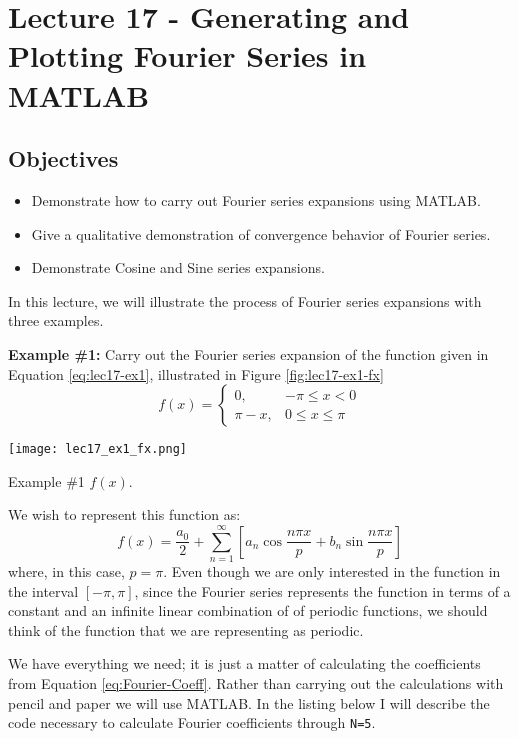 \chapter{Lecture 17 - Generating and Plotting Fourier Series in MATLAB}
\label{ch:lec17}
\section{Objectives}
\begin{itemize}
\item Demonstrate how to carry out Fourier series expansions using MATLAB.
\item Give a qualitative demonstration of convergence behavior of Fourier series.
\item Demonstrate Cosine and Sine series expansions.
\end{itemize}
In this lecture, we will illustrate the process of Fourier series expansions with three examples.

\vspace{0.5cm}

\noindent\textbf{Example \#1:}
Carry out the Fourier series expansion of the function given in Equation \ref{eq:lec17-ex1}, illustrated in Figure \ref{fig:lec17-ex1-fx}
\begin{equation}
f(x) = 
\begin{cases}
0, & -\pi \le x < 0 \\
\pi - x, & 0 \le x \le \pi
\end{cases}
\label{eq:lec17-ex1}
\end{equation}
\begin{marginfigure}
\texttt{[image: lec17\_ex1\_fx.png]}
\caption{Example \#1 $f(x)$.}
\label{fig:lec17-ex1-fx}
\end{marginfigure}
We wish to represent this function as:
\begin{equation*}
f(x) = \frac{a_0}{2} + \sum\limits_{n=1}^{\infty} \left[a_n \cos{\frac{n \pi x}{p}} + b_n \sin{\frac{n \pi x}{p}} \right]
\end{equation*}
where, in this case, $p = \pi$.  Even though we are only interested in the function in the interval $[-\pi, \pi]$, since the Fourier series represents the function in terms of a constant and an infinite linear combination of of periodic functions, we should think of the function that we are representing as periodic.

We have everything we need; it is just a matter of calculating the coefficients from Equation \ref{eq:Fourier-Coeff}.  Rather than carrying out the calculations with pencil and paper we will use MATLAB.  In the listing below I will describe the code necessary to calculate Fourier coefficients through \lstinline{N=5}.

